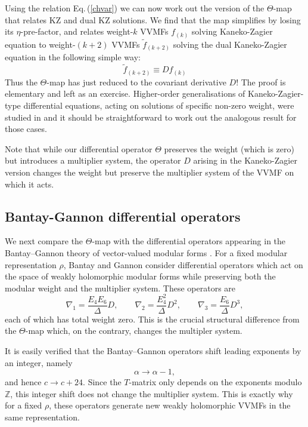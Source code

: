 \documentclass[11pt]{article}
\newcommand\tf{{\tilde f}}
\newcommand\be{\begin{equation}}
\newcommand\ee{\end{equation}}
\newcommand{\eref}[1]{Eq.\,(\ref{#1})}
\begin{document}
Using the relation \eref{chvar} we can now work out the version of the $\Theta$-map that relates KZ and dual KZ solutions. We find that the map simplifies by losing its $\eta$-pre-factor, and relates 
weight-$k$ VVMFs $f_{(k)}$ solving Kaneko-Zagier equation to weight-$(k+2)$ VVMFs $\tf_{(k+2)}$ solving the dual Kaneko-Zagier equation in the following simple way:
\begin{equation}
    \tf_{(k+2)}
    \equiv D f_{(k)}
\end{equation}
Thus the $\Theta$-map has just reduced to the covariant derivative $D$! The proof is elementary and left as an exercise. Higher-order generalisations of Kaneko-Zagier-type differential equations, acting on solutions of specific non-zero weight, were studied in \cite{Kaneko:2017joa, nagatomo2022MLDE} and it should be straightforward to work out the analogous result for those cases. 

Note that while our differential operator $\Theta$ preserves the weight (which is zero) but introduces a multiplier system, the operator $D$ arising in the Kaneko-Zagier version changes the weight but preserve the multiplier system of the VVMF on which it acts.

\subsection{Bantay-Gannon differential operators}

We next compare the \(\Theta\)-map with the differential operators appearing in the Bantay--Gannon theory of vector-valued modular forms \cite{Bantay:2007zz, Bantay:2010uy, Gannon:2013jua}. For a fixed modular representation \(\rho\), Bantay and Gannon consider differential operators which act on the space of weakly holomorphic modular forms while preserving both the modular weight and the multiplier system. These operators are
\be\label{eq:BG_diff}
  \nabla_1
  =
  \frac{E_4E_6}{\Delta}D,
  \qquad
  \nabla_2
  =
  \frac{E_4^2}{\Delta}D^2,
  \qquad
  \nabla_3
  =
  \frac{E_6}{\Delta}D^3,
\ee
each of which has total weight zero. This is the crucial structural difference from the \(\Theta\)-map which, on the contrary, changes the multipler system.

It is easily verified that the Bantay--Gannon operators shift leading exponents by an integer, namely \cite{Bantay:2007zz}
\be
  \alpha\to \alpha-1,
\ee
and hence $c\to c+24$. 
Since the \(T\)-matrix only depends on the exponents modulo \(\mathbb Z\), this integer shift
does not change the multiplier system. This is exactly why for a fixed \(\rho\), these operators generate new weakly holomorphic VVMFs in the same representation.
\end{document}
